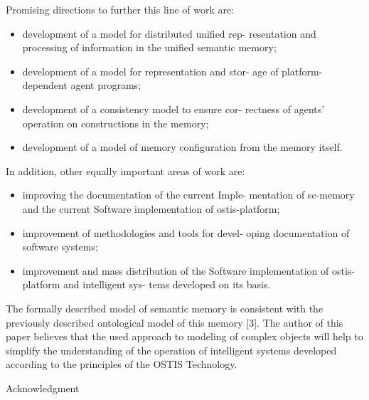 ﻿\documentclass[a4paper]{article}
\begin{document}
\begin{multicols}{2}
Promising directions to further this line of work are:
\begin{itemize}
    \item development of a model for distributed unified rep-
resentation and processing of information in the
unified semantic memory;
    \item development of a model for representation and stor-
age of platform-dependent agent programs;
    \item development of a consistency model to ensure cor-
rectness of agents’ operation on constructions in the
memory;
    \item development of a model of memory configuration
from the memory itself.
\end{itemize}
In addition, other equally important areas of work are:
\begin{itemize}
    \item improving the documentation of the current Imple-
mentation of sc-memory and the current Software
implementation of ostis-platform;
    \item improvement of methodologies and tools for devel-
oping documentation of software systems;
    \item improvement and mass distribution of the Software
implementation of ostis-platform and intelligent sys-
tems developed on its basis.
\end{itemize}



The formally described model of semantic memory
is consistent with the previously described ontological
model of this memory [3]. The author of this paper
believes that the used approach to modeling of complex
objects will help to simplify the understanding of the
operation of intelligent systems developed according to
the principles of the OSTIS Technology.
    \begin{center}
        \appendix Acknowledgment
    \end{center}



\end{multicols}
\end{document}
